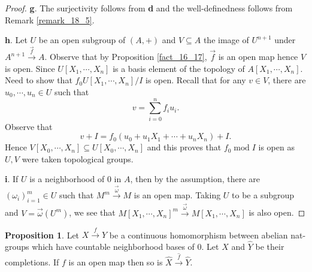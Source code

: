 \documentclass[10pt]{article}
\numberwithin{equation}{section}
\theoremstyle{definition}
\newtheorem{proposition}{Proposition}[subsection]
\DeclareMathOperator{\tmod}{mod}
\begin{document}
\begin{proof}
    \par\textbf{g}. The surjectivity follows from \textbf{d} and the well-definedness follows from Remark \ref{remark_18_5}.
    \par \textbf{h}. Let $U$ be an open subgroup of $(A,+)$ and $V\subseteq A$ the image of $U^{n+1}$ under $A^{n+1}\stackrel{\vec{f}}{\to}A$. Observe that by Proposition \ref{fact_16_17}, $\vec{f}$ is an open map hence $V$ is open.
    Since $U[X_1,\cdots,X_n]$ is a basis element of the topology of $A[X_1,\cdots,X_n]$. Need to show that $f_0U[X_1,\cdots,X_n]/I$ is open. Recall that for any $v\in V$, there are $u_0,\cdots,u_n\in U$ such that
    \begin{equation*}
    v = \sum_{i=0}^n f_iu_i.
    \end{equation*}
    Observe that
    \begin{equation*}
    v + I = f_0(u_0+u_1X_1+\cdots+u_nX_n) + I.
    \end{equation*}
    Hence $V[X_0,\cdots,X_n]\subseteq U[X_0,\cdots,X_n]$ and this proves that $f_0\tmod{I}$ is open as $U,V$ were taken topological groups.
   \par \textbf{i}. If $U$ is a neighborhood of $0$ in $A$, then by the assumption, there are $(\omega_i)_{i=1}^m\in U$ such that $M^m\stackrel{\vec{\omega}}{\to}M$ is an open map. Taking $U$ to be a subgroup and $V = \vec{\omega}(U^m)$, we see that $M[X_1,\cdots,X_n]^m\stackrel{\vec{\omega}}{\to}M[X_1,\cdots,X_n]$ is also open.
\end{proof}
\begin{proposition}
    \label{fact_20_2}
    Let $X\stackrel{f}{\to}Y$ be a continuous homomorphism between abelian nat-groups which have countable neighborhood bases of $0$. Let $\widehat{X}$ and $\widehat{Y}$ be their completions. If $f$ is an open map then so is $\widehat{X}\stackrel{\widehat{f}}{\to}\widehat{Y}$.
\end{proposition}
\end{document}
